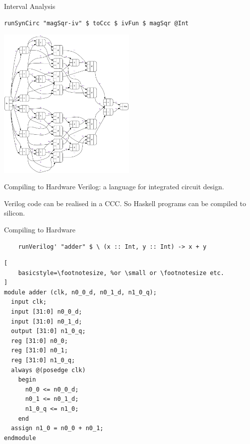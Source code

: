 \documentclass[10pt]{beamer}
\theoremstyle{definition}
\theoremstyle{remark}
\numberwithin{equation}{section}
\begin{document}
\begin{frame}[fragile]{Interval Analysis}
  \begin{lstlisting}[frame=single]
    runSynCirc "magSqr-iv" $ toCcc $ ivFun $ magSqr @Int
  \end{lstlisting}
  \begin{center}
    \includegraphics[width=0.5\textwidth]{magSqr-iv.pdf}
  \end{center}
\end{frame}

\begin{frame}[fragile]{Compiling to Hardware}
  Verilog: a language for integrated circuit design.

  Verilog code can be realised in a CCC. So Haskell programs can be compiled to silicon.
\end{frame}

\begin{frame}[fragile]{Compiling to Hardware}
  \begin{lstlisting}
    runVerilog' "adder" $ \ (x :: Int, y :: Int) -> x + y
  \end{lstlisting}
  \begin{lstlisting}[
    basicstyle=\footnotesize, %or \small or \footnotesize etc.
]
module adder (clk, n0_0_d, n0_1_d, n1_0_q);
  input clk;
  input [31:0] n0_0_d;
  input [31:0] n0_1_d;
  output [31:0] n1_0_q;
  reg [31:0] n0_0;
  reg [31:0] n0_1;
  reg [31:0] n1_0_q;
  always @(posedge clk)
    begin
      n0_0 <= n0_0_d;
      n0_1 <= n0_1_d;
      n1_0_q <= n1_0;
    end
  assign n1_0 = n0_0 + n0_1;
endmodule
  \end{lstlisting}
\end{frame}
\end{document}
